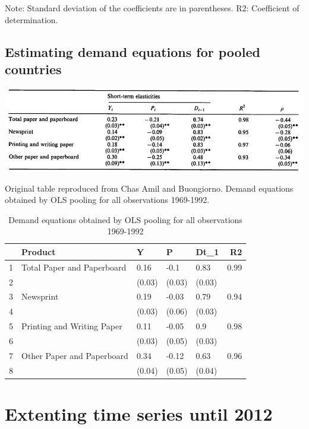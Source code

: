 \documentclass{scrartcl}\usepackage{graphicx, color}
\begin{document}
\newpage
Note: Standard deviation of the coefficients are in parentheses.
R2: Coefficient of determination.


\newpage
\subsection{Estimating demand equations for pooled countries}
\begin{table}[h]
\centering
\includegraphics[width=0.7\linewidth]{./figure/ChasAmilEstimationTable2}
\caption{Original table reproduced from Chas Amil and Buongiorno. Demand equations obtained by OLS pooling for all observations 1969-1992.}
\label{fig:ChasAmilEstimationTable2}
\end{table}
    
\begin{table}[ht]
\centering
\begin{tabular}{rllllr}
  \hline
 & Product & Y & P & Dt\_1 & R2 \\ 
  \hline
1 & Total Paper and Paperboard & 0.16 & -0.1 & 0.83 & 0.99 \\ 
  2 &  & (0.03) & (0.03) & (0.03) &  \\ 
  3 & Newsprint & 0.19 & -0.03 & 0.79 & 0.94 \\ 
  4 &  & (0.03) & (0.06) & (0.03) &  \\ 
  5 & Printing and Writing Paper & 0.11 & -0.05 & 0.9 & 0.98 \\ 
  6 &  & (0.03) & (0.05) & (0.03) &  \\ 
  7 & Other Paper and Paperboard & 0.34 & -0.12 & 0.63 & 0.96 \\ 
  8 &  & (0.04) & (0.05) & (0.04) &  \\ 
   \hline
\end{tabular}
\caption{Demand equations obtained by OLS pooling for all observations 1969-1992} 
\label{DemandPooled}
\end{table}





\newpage
\section{Extenting time series until 2012}
\end{document}
